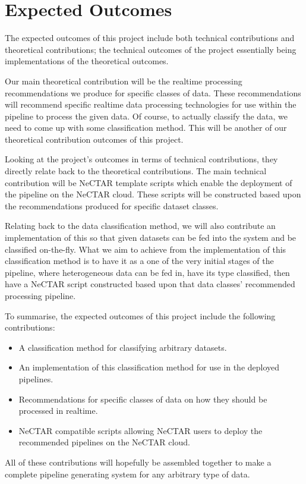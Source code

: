 \documentclass[a4paper,11pt]{article}
\begin{document}




\section{Expected Outcomes} %
\label{sec:expected_outcomes}

The expected outcomes of this project include both technical contributions and theoretical contributions; the technical
outcomes of the project essentially being implementations of the theoretical outcomes.

Our main theoretical contribution will be the realtime processing recommendations we produce for specific classes of
data. These recommendations will recommend specific realtime data processing technologies for use within the pipeline to
process the given data. Of course, to actually classify the data, we need to come up with some classification method.
This will be another of our theoretical contribution outcomes of this project.

Looking at the project's outcomes in terms of technical contributions, they directly relate back to the theoretical
contributions. The main technical contribution will be NeCTAR template scripts which enable the deployment of the
pipeline on the NeCTAR cloud. These scripts will be constructed based upon the recommendations produced for specific
dataset classes.

Relating back to the data classification method, we will also contribute an implementation of this so that given
datasets can be fed into the system and be classified on-the-fly. What we aim to achieve from the implementation of this
classification method is to have it as a one of the very initial stages of the pipeline, where heterogeneous data can be
fed in, have its type classified, then have a NeCTAR script constructed based upon that data classes' recommended
processing pipeline.

To summarise, the expected outcomes of this project include the following contributions:

\begin{itemize}
  \item A classification method for classifying arbitrary datasets.
  \item An implementation of this classification method for use in the deployed pipelines.
  \item Recommendations for specific classes of data on how they should be processed in realtime.
  \item NeCTAR compatible scripts allowing NeCTAR users to deploy the recommended pipelines on the NeCTAR cloud.
\end{itemize}

All of these contributions will hopefully be assembled together to make a complete pipeline generating system for any
arbitrary type of data.



\newpage



\end{document}

